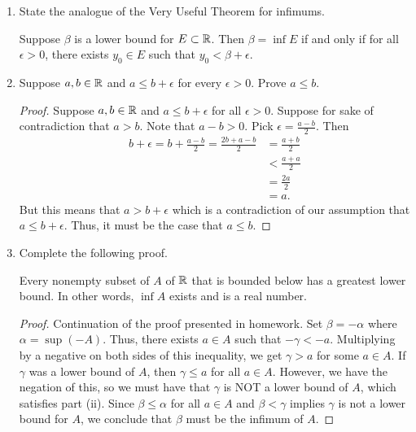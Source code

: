 \documentclass[11pt,a4paper]{article}
\begin{document}
\begin{enumerate}
 \item State the analogue of the Very Useful Theorem for infimums. \label{Problem 3}
     \begin{solution}
        Suppose \( \beta  \) is a lower bound for \( E \subset \mathbb{R}    \). Then \( \beta = \inf E  \) if and only if for all \( \epsilon > 0  \), there exists \( {y}_{0} \in E  \) such that \( {y}_{0} < \beta + \epsilon  \).
        \end{solution}
    \item Suppose \( a,b \in \mathbb{R}  \) and \( a \leq b + \epsilon  \) for every \( \epsilon > 0  \). Prove \( a \leq b  \). \label{Problem 5}
        \begin{proof}
        Suppose \( a, b \in \mathbb{R}  \) and \( a \leq b + \epsilon  \) for all \( \epsilon > 0  \). Suppose for sake of contradiction that \(  a > b  \). Note that \( a - b > 0   \). Pick \( \epsilon  = \frac{  a - b  }{  2  }  \). Then 
        \begin{align*}
            b  + \epsilon = b + \frac{ a - b  }{ 2 } = \frac{  2b + a - b }{ 2  }     
                                                     &= \frac{ a  +b  }{ 2  } \\ 
                                                     &< \frac{ a + a  }{ 2  } \\
                                                     &= \frac{ 2 a  }{  2  } \\
                                                     &= a.
        \end{align*}
        But this means that \( a > b + \epsilon  \) which is a contradiction of our assumption that \( a \leq b + \epsilon  \). Thus, it must be the case that \( a \leq b  \).
    \end{proof}
    \item Complete the following proof.   
\begin{theorem}
   Every nonempty subset of \( A  \) of \( \mathbb{R}  \) that is bounded below has a greatest lower bound. In other words, \( \inf A  \) exists and is a real number.   
\end{theorem}
\begin{proof}
Continuation of the proof presented in homework. Set \( \beta = - \alpha  \) where \(  \alpha  = \sup (-A )   \). Thus, there exists \( a \in A  \) such that \( - \gamma < - a  \). Multiplying by a negative on both sides of this inequality, we get \(  \gamma > a  \) for some \( a \in A  \). If \( \gamma  \) was a lower bound of \( A  \), then \( \gamma \leq a   \) for all \( a \in A  \). However, we have the negation of this, so we must have that \( \gamma  \) is NOT a lower bound of \( A  \), which satisfies part (ii). Since \( \beta \leq \alpha  \) for all \( a \in A  \) and \( \beta < \gamma  \) implies \( \gamma  \) is not a lower bound for \( A  \), we conclude that \( \beta  \) must be the infimum of \( A  \).  

\end{proof}
\end{enumerate}
\end{document}
